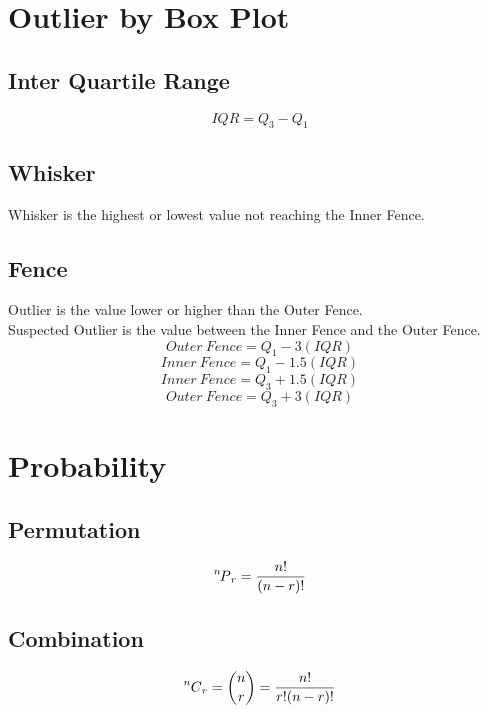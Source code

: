 \documentclass[twocolumn]{article}
\newcommand\Perm[2][^n]{\prescript{#1\mkern-2.5mu}{}P_{#2}}
\newcommand\Comb[2][^n]{\prescript{#1\mkern-0.5mu}{}C_{#2}}
\begin{document}
\newpage

\section{Outlier by Box Plot}
\subsection{Inter Quartile Range}
\begin{equation}
    IQR = Q_{3}-Q_{1}
\end{equation}
\subsection{Whisker}
Whisker is the highest or lowest value not reaching the Inner Fence.
\subsection{Fence}
Outlier is the value lower or higher than the Outer Fence.\\
Suspected Outlier is the value between the Inner Fence and the Outer Fence.
\begin{equation}
    Outer\ Fence = Q_{1} - 3(IQR)
\end{equation}
\begin{equation}
    Inner\ Fence = Q_{1} - 1.5(IQR)
\end{equation}
\begin{equation}
    Inner\ Fence = Q_{3} + 1.5(IQR)
\end{equation}
\begin{equation}
    Outer\ Fence = Q_{3} + 3(IQR)
\end{equation}
\section{Probability}
\subsection{Permutation}
\begin{equation}
    \Perm[n]{r} = \frac{n!}{(n-r)!}
\end{equation}
\subsection{Combination}
\begin{equation}
    \Comb[n]{r} = \binom{n}{r} = \frac{n!}{r!(n-r)!}
\end{equation}
\end{document}
